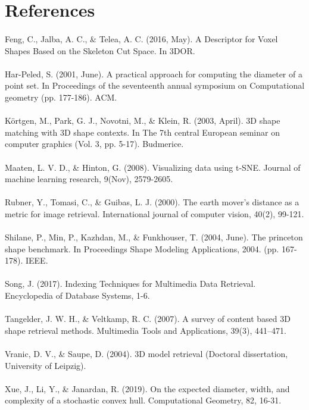 \documentclass{bigdata}
\begin{document}
\newpage

\section{References}
\paragraph{} Feng, C., Jalba, A. C., \& Telea, A. C. (2016, May). A Descriptor for Voxel Shapes Based on the Skeleton Cut Space. In 3DOR.
\paragraph{} Har-Peled, S. (2001, June). A practical approach for computing the diameter of a point set. In Proceedings of the seventeenth annual symposium on Computational geometry (pp. 177-186). ACM.
\paragraph{} Körtgen, M., Park, G. J., Novotni, M., \& Klein, R. (2003, April). 3D shape matching with 3D shape contexts. In The 7th central European seminar on computer graphics (Vol. 3, pp. 5-17). Budmerice.
\paragraph{} Maaten, L. V. D., \& Hinton, G. (2008). Visualizing data using t-SNE. Journal of machine learning research, 9(Nov), 2579-2605.
\paragraph{} Rubner, Y., Tomasi, C., \& Guibas, L. J. (2000). The earth mover's distance as a metric for image retrieval. International journal of computer vision, 40(2), 99-121.
\paragraph{} Shilane, P., Min, P., Kazhdan, M., \& Funkhouser, T. (2004, June). The princeton shape benchmark. In Proceedings Shape Modeling Applications, 2004. (pp. 167-178). IEEE.
\paragraph{} Song, J. (2017). Indexing Techniques for Multimedia Data Retrieval. Encyclopedia of Database Systems, 1-6.
\paragraph{} Tangelder, J. W. H., \& Veltkamp, R. C. (2007). A survey of content based 3D shape retrieval methods. Multimedia Tools and Applications, 39(3), 441–471.
\paragraph{} Vranic, D. V., \& Saupe, D. (2004). 3D model retrieval (Doctoral dissertation, University of Leipzig).
\paragraph{} Xue, J., Li, Y., \& Janardan, R. (2019). On the expected diameter, width, and complexity of a stochastic convex hull. Computational Geometry, 82, 16-31.
\end{document}

